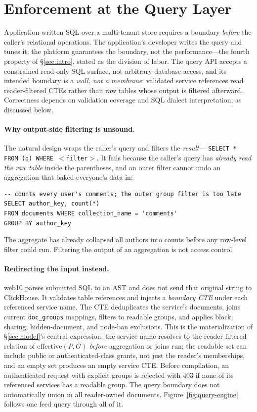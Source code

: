 \documentclass[sigconf, nonacm]{acmart}
\begin{document}
\section{Enforcement at the Query Layer}
\label{sec:enforcement}

Application-written SQL over a multi-tenant store requires a boundary
\emph{before} the caller's relational operations. The application's developer
writes the query and tunes it; the platform guarantees the boundary, not the
performance---the fourth property of \S\ref{sec:intro}, stated as the
division of labor. The query API accepts a constrained read-only SQL surface,
not arbitrary database access, and its intended boundary is a \emph{wall,
not a membrane}: validated service references read reader-filtered CTEs
rather than raw tables whose output is filtered afterward. Correctness
depends on validation coverage and SQL dialect interpretation, as discussed
below.

\paragraph{Why output-side filtering is unsound.} The natural design wraps
the caller's query and filters the \emph{result}---
\texttt{SELECT * FROM (q) WHERE $<$filter$>$}. It fails because the caller's
query has \emph{already read the raw table} inside the parentheses, and an
outer filter cannot undo an aggregation that baked everyone's data in:
\begin{lstlisting}[style=sql]
-- counts every user's comments; the outer group filter is too late
SELECT author_key, count(*)
FROM documents WHERE collection_name = 'comments'
GROUP BY author_key
\end{lstlisting}
The aggregate has already collapsed all authors into counts before any
row-level filter could run. Filtering the output of an aggregation is not
access control.

\paragraph{Redirecting the input instead.} web10 parses submitted SQL to an
AST and does not send that original string to ClickHouse. It validates table
references and injects a \emph{boundary CTE} under each referenced service
name. The CTE deduplicates the service's documents, joins current
\texttt{doc\_groups} mappings, filters to readable groups, and applies
block, sharing, hidden-document, and node-ban exclusions. This is the
materialization of \S\ref{sec:model}'s central expression: the service name
resolves to the reader-filtered relation of
$\mathrm{effective}(P, G)$ \emph{before} aggregation or joins run; the
readable set can include public or authenticated-class grants, not just the
reader's memberships, and an empty set produces an empty service CTE. Before
compilation, an authenticated request with explicit groups is rejected with
403 if none of its referenced services has a readable group. The query
boundary does not automatically union in all reader-owned documents.
Figure~\ref{fig:query-engine} follows one feed query through all of it.
\end{document}
